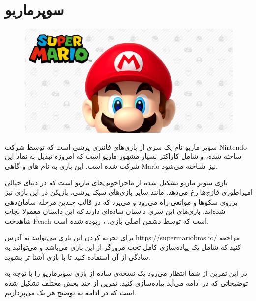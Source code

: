 \documentclass{utap}
\begin{document}
	\section{سوپرماریو}
	
	\begin{figure}[H]
		\begin{center}
			\includegraphics[width=\textwidth]{cover.jpg}
		\end{center}
	\end{figure}
سوپر ماریو نام یک سری از بازی‌های فانتزی پرشی  است که توسط شرکت Nintendo ساخته شده، و شامل کاراکتر بسیار مشهور ماریو است که امروزه تبدیل به نماد این شرکت شده است. این بازی به نام های  و گاهی Mario نیز شناخته می‌شود.

بازی سوپر ماریو تشکیل شده از ماجراجویی‌های ماریو است که در دنیای خیالی امپراطوری قازچ‌ها  رخ می‌دهد. مانند سایر بازی‌های سبک پرشی، بازیکن در این بازی نیز برروی سکو‌ها و موانعی راه می‌رود و می‌پرد که در قالب چندین مرحله‌ سامان‌دهی شده‌اند. بازی‌های این سری داستان ساده‌ای دارند که این داستان معمولا نجات شاهدخت Peach است که توسط دشمن اصلی بازی، ، ربوده شده است.

برای تجربه کردن این بازی می‌توانید به آدرس \url{https://supermariobros.io/} مراجعه کنید که شامل یک پیاده‌سازی کامل تحت مرورگر از این بازی می‌باشد و می‌توانید به سادگی از آن استفاده کنید تا با بازی آشنا تر بشوید.

در این تمرین از شما انتظار می‌رود یک نسخه‌ی ساده از بازی سوپرماریو را با توجه به توضیحاتی که در ادامه می‌آید پیاده‌سازی کنید. تمرین از چند بخش مختلف تشکیل شده است که در ادامه به توضیح هر یک می‌پردازیم.
\end{document}
